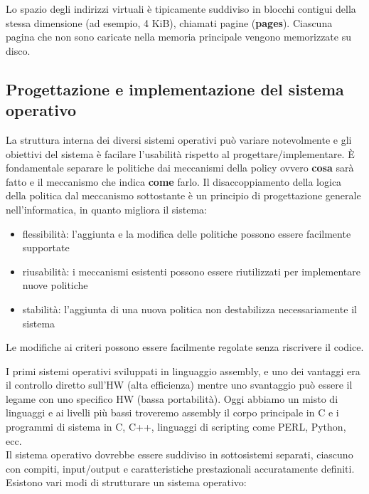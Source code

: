 \documentclass{article}
\begin{document}
Lo spazio degli indirizzi virtuali è tipicamente suddiviso in blocchi contigui della stessa dimensione (ad esempio, 4 KiB), chiamati pagine (\textbf{pages}). Ciascuna pagina che non sono caricate nella memoria principale vengono memorizzate su disco.

\pagebreak

\subsection{Progettazione e implementazione del sistema operativo}
La struttura interna dei diversi sistemi operativi può variare notevolmente e gli obiettivi del sistema è facilare l'usabilità rispetto al progettare/implementare. È fondamentale separare le politiche dai meccanismi della policy ovvero \textbf{cosa} sarà fatto e il meccanismo che indica \textbf{come} farlo.
Il disaccoppiamento della logica della politica dal meccanismo sottostante è un principio di progettazione generale nell'informatica, in quanto migliora il sistema:
\begin{itemize}
    \item flessibilità: l'aggiunta e la modifica delle politiche possono essere facilmente supportate
    \item riusabilità: i meccanismi esistenti possono essere riutilizzati per implementare nuove politiche 
    \item stabilità: l'aggiunta di una nuova politica non destabilizza necessariamente il sistema    
\end{itemize}
Le modifiche ai criteri possono essere facilmente regolate senza riscrivere il codice.

I primi sistemi operativi sviluppati in linguaggio assembly, e uno dei vantaggi era il controllo diretto sull'HW (alta efficienza) mentre uno svantaggio può essere il legame con uno specifico HW (bassa portabilità). Oggi abbiamo un misto di linguaggi e ai livelli più bassi troveremo assembly il corpo principale in C e i programmi di sistema in C, C++, linguaggi di scripting come PERL, Python, ecc.\\
Il sistema operativo dovrebbe essere suddiviso in sottosistemi separati, ciascuno con compiti, input/output e caratteristiche prestazionali accuratamente definiti. Esistono vari modi di strutturare un sistema operativo: 
\end{document}
